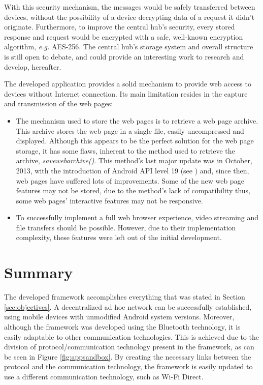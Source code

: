 \begin{itemize}
	With this security mechanism, the messages would be safely transferred between devices, without the possibility of a device decrypting data of a request it didn't originate. Furthermore, to improve the central hub's security, every stored response and request would be encrypted with a safe, well-known encryption algorithm, \textit{e.g.} \gls{AES}-256. The central hub's storage system and overall structure is still open to debate, and could provide an interesting work to research and develop, hereafter.
	
\end{itemize}

The developed application provides a solid mechanism to provide web access to devices without Internet connection. Its main limitation resides in the capture and transmission of the web pages:

\begin{itemize}
	
	\item The mechanism used to store the web pages is to retrieve a web page archive. This archive stores the web page in a single file, easily uncompressed and displayed. Although this appears to be the perfect solution for the web page storage, it has some flaws, inherent to the method used to retrieve the archive, \textit{savewebarchive()}. This method's last major update was in October, 2013, with the introduction of Android API level 19 (see \cite{kitkat}) and, since then, web pages have suffered lots of improvements. Some of the new web page features may not be stored, due to the method's lack of compatibility thus, some web pages' interactive features may not be responsive.
	
	\item To successfully implement a full web browser experience, video streaming and file transfers should be possible. However, due to their implementation complexity, these features were left out of the initial development.
	
\end{itemize}


\section{Summary}


The developed framework accomplishes everything that was stated in Section \ref{sec:objectives}. A decentralized ad hoc network can be successfully established, using mobile devices with unmodified Android system versions. Moreover, although the framework was developed using the Bluetooth technology, it is easily adaptable to other communication technologies. This is achieved due to the division of protocol/communication technology present in the framework, as can be seen in Figure \ref{fig:appsandbox}. By creating the necessary links between the protocol and the communication technology, the framework is easily updated to use a different communication technology, such as Wi-Fi Direct.

